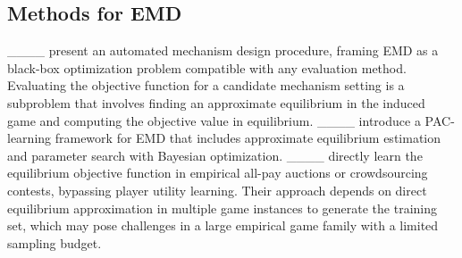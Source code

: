 \subsection{Methods for EMD}

____ present an automated mechanism design procedure, framing EMD as a black-box optimization problem compatible with any evaluation method.
Evaluating the objective function for a candidate mechanism setting is a subproblem that involves finding an approximate equilibrium in the induced game and computing the objective value in equilibrium. 
____ introduce a PAC-learning framework for EMD that includes approximate equilibrium estimation and parameter search with Bayesian optimization.
____ directly learn the equilibrium objective function in empirical all-pay auctions or crowdsourcing contests, bypassing player utility learning.
Their approach depends on direct equilibrium approximation in multiple game instances to generate the training set, which may pose challenges in a large empirical game family with a limited sampling budget. 


